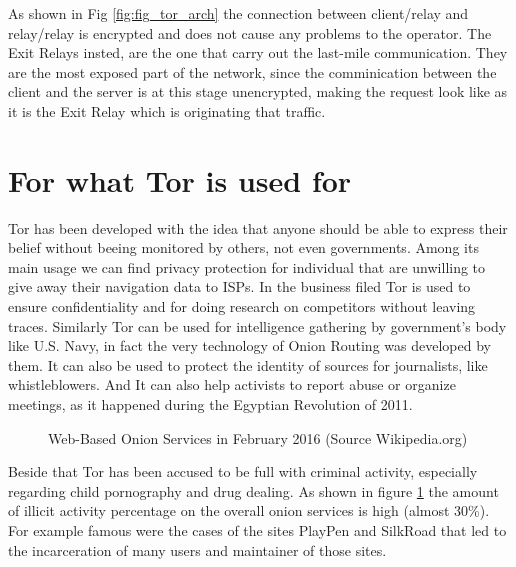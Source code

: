 \documentclass[runningheads,a4paper]{llncs}
\begin{document}
As shown in Fig \ref{fig:fig_tor_arch} the connection between client/relay and relay/relay is encrypted
and does not cause any problems to the operator. The Exit Relays insted, are the one that carry out the 
last-mile communication. They are the most exposed part of the network, since the comminication between
the client and the server is at this stage unencrypted, making the request look like as it is the 
Exit Relay which is originating that traffic. 

\section{For what Tor is used for}
Tor has been developed with the idea that anyone should be able to express their belief without beeing monitored by others, not even governments. Among its main usage we can find privacy protection for individual that are unwilling to give away their navigation data to ISPs. In the business filed Tor is used to ensure confidentiality and for doing research on competitors without leaving traces. Similarly Tor can be used for intelligence gathering by government's body like U.S. Navy, in fact the very technology of Onion Routing was developed by them. It can also be used to protect the identity of sources for journalists, like whistleblowers. And It can also help activists to report abuse or organize meetings, as it happened during the Egyptian Revolution of 2011. \cite{WASH_715}

\begin{figure}[]
        \caption{Web-Based Onion Services in February 2016 (Source Wikipedia.org)}
        \label{fig:fig_tor_ill}
\end{figure}

Beside that Tor has been accused to be full with criminal activity, especially regarding child pornography and drug dealing. As shown in figure \ref{fig:fig_tor_ill} the amount of illicit activity percentage on the overall onion services is high (almost 30\%). For example famous were the cases of the sites PlayPen and SilkRoad that led to the incarceration of many users and maintainer of those sites. 
\end{document}
